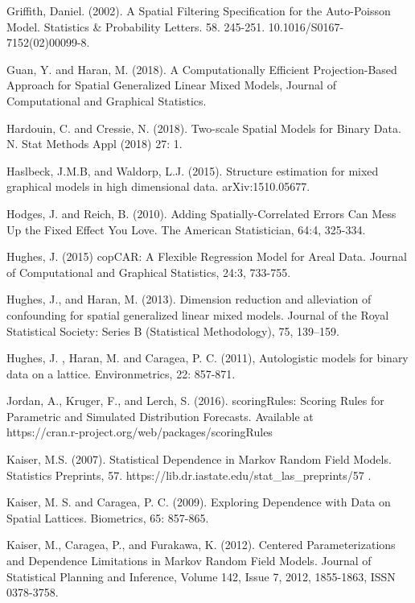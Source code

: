 \documentclass[12pt, a4paper, twoside]{article}
\begin{document}
\begin{thebibliography}{9}
	 Griffith, Daniel. (2002). A Spatial Filtering Specification for the Auto-Poisson Model. Statistics \& Probability Letters. 58. 245-251. 10.1016/S0167-7152(02)00099-8.
	
	  Guan, Y. and Haran, M. (2018). A Computationally Efficient Projection-Based Approach for Spatial Generalized Linear Mixed Models, Journal of Computational and Graphical Statistics.
	
	 Hardouin, C. and Cressie, N. (2018). Two-scale Spatial Models for Binary Data. N. Stat Methods Appl (2018) 27: 1. 
	
	 Haslbeck, J.M.B, and Waldorp, L.J. (2015). Structure estimation for mixed graphical models in high dimensional data. arXiv:1510.05677.
	
	 Hodges, J. and Reich, B. (2010). Adding Spatially-Correlated Errors Can Mess Up the Fixed Effect You Love. The American Statistician, 64:4, 325-334.
	
	 Hughes, J. (2015) copCAR: A Flexible Regression Model for Areal Data. Journal of Computational and Graphical Statistics, 24:3, 733-755.
	
	 Hughes, J., and Haran, M. (2013). Dimension reduction and alleviation of confounding for spatial generalized linear mixed models. Journal of the Royal Statistical Society: Series B (Statistical Methodology), 75, 139–159. 
	
	 Hughes, J. , Haran, M. and Caragea, P. C. (2011), Autologistic models for binary data on a lattice. Environmetrics, 22: 857-871.
	
	 Jordan, A., Kruger, F., and Lerch, S. (2016). scoringRules: Scoring Rules for Parametric and Simulated Distribution Forecasts. Available at\\ https://cran.r-project.org/web/packages/scoringRules 
	
	 Kaiser, M.S. (2007). Statistical Dependence in Markov Random Field Models. Statistics Preprints, 57. https://lib.dr.iastate.edu/stat\_las\_preprints/57 .
	
	 Kaiser, M. S. and Caragea, P. C. (2009). Exploring Dependence with Data on Spatial Lattices. Biometrics, 65: 857-865. 
	
	 Kaiser, M., Caragea, P., and Furakawa, K. (2012). Centered Parameterizations and Dependence Limitations in Markov Random Field Models. Journal of Statistical Planning and Inference, Volume 142, Issue 7, 2012, 1855-1863, ISSN 0378-3758.
	

\end{thebibliography}
\end{document}
